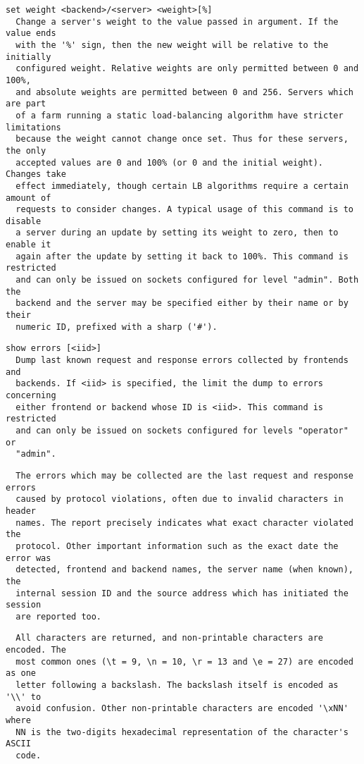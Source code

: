 \begin{verbatim}
set weight <backend>/<server> <weight>[%]
  Change a server's weight to the value passed in argument. If the value ends
  with the '%' sign, then the new weight will be relative to the initially
  configured weight. Relative weights are only permitted between 0 and 100%,
  and absolute weights are permitted between 0 and 256. Servers which are part
  of a farm running a static load-balancing algorithm have stricter limitations
  because the weight cannot change once set. Thus for these servers, the only
  accepted values are 0 and 100% (or 0 and the initial weight). Changes take
  effect immediately, though certain LB algorithms require a certain amount of
  requests to consider changes. A typical usage of this command is to disable
  a server during an update by setting its weight to zero, then to enable it
  again after the update by setting it back to 100%. This command is restricted
  and can only be issued on sockets configured for level "admin". Both the
  backend and the server may be specified either by their name or by their
  numeric ID, prefixed with a sharp ('#').
\end{verbatim}

\begin{verbatim}
show errors [<iid>]
  Dump last known request and response errors collected by frontends and
  backends. If <iid> is specified, the limit the dump to errors concerning
  either frontend or backend whose ID is <iid>. This command is restricted
  and can only be issued on sockets configured for levels "operator" or
  "admin".
\end{verbatim}

\begin{verbatim}
  The errors which may be collected are the last request and response errors
  caused by protocol violations, often due to invalid characters in header
  names. The report precisely indicates what exact character violated the
  protocol. Other important information such as the exact date the error was
  detected, frontend and backend names, the server name (when known), the
  internal session ID and the source address which has initiated the session
  are reported too.
\end{verbatim}

\begin{verbatim}
  All characters are returned, and non-printable characters are encoded. The
  most common ones (\t = 9, \n = 10, \r = 13 and \e = 27) are encoded as one
  letter following a backslash. The backslash itself is encoded as '\\' to
  avoid confusion. Other non-printable characters are encoded '\xNN' where
  NN is the two-digits hexadecimal representation of the character's ASCII
  code.
\end{verbatim}

